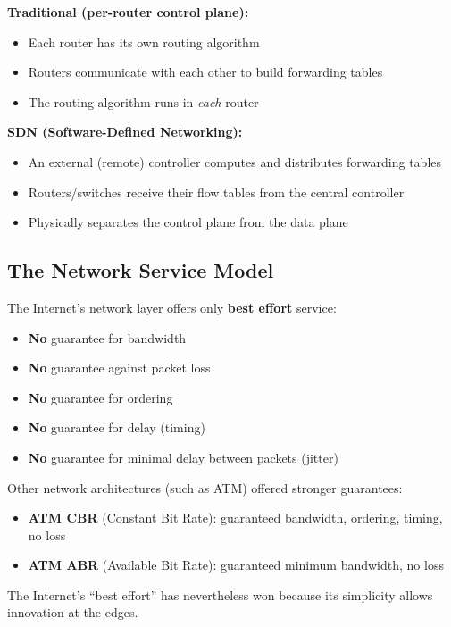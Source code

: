 \begin{keybox}
\textbf{Traditional (per-router control plane):}
\begin{itemize}[noitemsep]
    \item Each router has its own routing algorithm
    \item Routers communicate with each other to build forwarding tables
    \item The routing algorithm runs in \emph{each} router
\end{itemize}

\textbf{SDN (Software-Defined Networking):}
\begin{itemize}[noitemsep]
    \item An external (remote) controller computes and distributes forwarding tables
    \item Routers/switches receive their flow tables from the central controller
    \item Physically separates the control plane from the data plane
\end{itemize}
\end{keybox}

\begin{imagebox}
\end{imagebox}

\subsection{The Network Service Model}

\begin{keybox}
The Internet's network layer offers only \textbf{best effort} service:
\begin{itemize}[noitemsep]
    \item \textbf{No} guarantee for bandwidth
    \item \textbf{No} guarantee against packet loss
    \item \textbf{No} guarantee for ordering
    \item \textbf{No} guarantee for delay (timing)
    \item \textbf{No} guarantee for minimal delay between packets (jitter)
\end{itemize}
\end{keybox}

\begin{warnbox}
Other network architectures (such as ATM) offered stronger guarantees:
\begin{itemize}[noitemsep]
    \item \textbf{ATM CBR} (Constant Bit Rate): guaranteed bandwidth, ordering, timing, no loss
    \item \textbf{ATM ABR} (Available Bit Rate): guaranteed minimum bandwidth, no loss
\end{itemize}
The Internet's ``best effort'' has nevertheless won because its simplicity allows innovation at the edges.
\end{warnbox}

